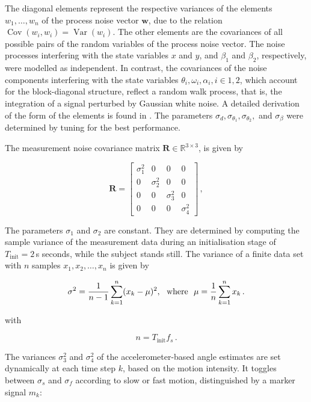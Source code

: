 \noindent
The diagonal elements represent the respective variances of the elements $w_1, \dots, w_n$ of the process noise vector $\mathbf{w}$, due to the relation $\operatorname{Cov}(w_i,w_i) = \operatorname{Var}(w_i)$. The other elements are the covariances of all possible pairs of the random variables of the process noise vector. The noise processes interfering with the state variables $x$ and $y$, and $\beta_1$ and $\beta_2$, respectively, were modelled as independent. In contrast, the covariances of the noise components interfering with the state variables $\theta_i, \omega_i, \alpha_i, i \in {1, 2}$, which account for the block-diagonal structure, reflect a random walk process, that is, the integration of a signal perturbed by Gaussian white noise. A detailed derivation of the form of the elements is found in \cite{Kelly_1994_random}. The parameters $\sigma_d, \sigma_{\theta_1}, \sigma_{\theta_2},$ and $\sigma_{\beta}$ were determined by tuning for the best performance.

The measurement noise covariance matrix $\mathbf{R} \in \mathbb{R}^{3 \times 3}$, is given by

\begin{equation}
\mathbf{R} = \begin{bmatrix}
  \sigma^2_1 & 0 & 0 & 0\\
  0 & \sigma^2_2 & 0 & 0\\
  0 & 0 & \sigma^2_3 & 0\\
  0 & 0 & 0 & \sigma^2_4
\end{bmatrix}\,,
\end{equation}

The parameters $\sigma_1$ and $\sigma_2$ are constant. They are determined by computing the sample variance of the measurement data during an initialisation stage of $T_{\text{init}} = 2$\,s seconds, while the subject stands still. The variance of a finite data set with $n$ samples $x_1, x_2, \dots, x_n$ is given by

\begin{equation}
  \sigma^2 = \frac{1}{n-1} \sum_{k=1}^n (x_k - \mu)^2, {\rm \ \ where\ \ } \mu = \frac{1}{n} \sum_{k=1}^n x_k\,.
\end{equation}

\noindent
with

\begin{equation}
  n = T_{\text{init}} f_s\,.
\end{equation}


\noindent
The variances $\sigma^2_3$ and $\sigma^2_4$ of the accelerometer-based angle estimates are set dynamically at each time step $k$, based on the motion intensity. It toggles between $\sigma_s$ and $\sigma_f$ according to slow or fast motion, distinguished by a marker signal $m_k$:

